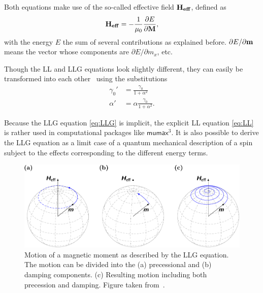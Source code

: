 \documentclass[11pt,a4paper,english]{article}
\newcommand{\mumax}{$\mathsf{mumax}^3$}
\begin{document}
Both equations make use of the so-called effective field $\vb{H_{eff}}$, defined as
\begin{equation}
	\vb{H_{eff}} = - \frac{1}{\mu_0} \frac{\partial E}{\partial \vb{M}} \mathrm{,}
	\label{eq:H_eff}
\end{equation}
with the energy $E$ the sum of several contributions as explained before. $\partial E/\partial \vb{m}$ means the vector whose components are $\partial E/\partial m_x$, etc.~\cite{ThermFluc_SingleDomain}

Though the LL and LLG equations look slightly different, they can easily be transformed into each other~\cite{ThermFluc_SingleDomain,phd_leliaert} using the substitutions
\begin{align*}
    \gamma_0' &= \frac{\gamma_0}{1+\alpha^2} \\
    \alpha' &= \alpha \frac{\gamma_0}{1+\alpha^2} \mathrm{.}
\end{align*}

Because the LLG equation \eqref{eq:LLG} is implicit, the explicit LL equation \eqref{eq:LL} is rather used in computational packages like \mumax{}. %
It is also possible to derive the LLG equation as a limit case of a quantum mechanical description of a spin subject to the effects corresponding to the different energy terms.~\cite{abert2013discrete,bode2012current}

\begin{figure}
    \centering
    \includegraphics[width=0.9\columnwidth]{Figures/Introduction/abert2013discrete - Figure 2.2.pdf}
    \caption{Motion of a magnetic moment as described by the LLG equation. The motion can be divided into the (a) precessional and (b) damping components. (c) Resulting motion including both precession and damping. Figure taken from~\cite{abert2013discrete}.}
    \label{fig:LLG_motion_Heff}
\end{figure}
\end{document}
